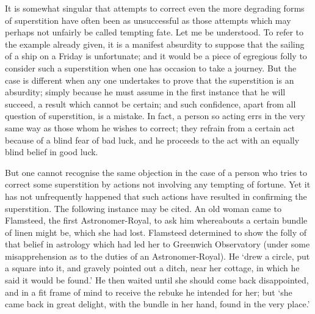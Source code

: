 \documentclass[letterpaper,12pt,oneside,openany]{memoir}
\begin{document}
It is somewhat singular that attempts to correct
even the more degrading forms of superstition have
often been as unsuccessful as those attempts which may
perhaps not unfairly be called tempting fate. Let me
be understood. To refer to the example already given,
it is a manifest absurdity to suppose that the sailing of
a ship on a Friday is unfortunate; and it would be a
piece of egregious folly to consider such a superstition
when one has occasion to take a journey. But the case
is different when any one undertakes to prove that the
superstition is an absurdity; simply because he must
assume in the first instance that he will succeed, a
result which cannot be certain; and such confidence,
apart from all question of superstition, is a mistake.
In fact, a person so acting errs in the very same way as
those whom he wishes to correct; they refrain from a
certain act because of a blind fear of bad luck, and he
proceeds to the act with an equally blind belief in good
luck.

But one cannot recognise the same objection in the
case of a person who tries to correct some superstition
by actions not involving any tempting of fortune.
Yet it has not unfrequently happened that such actions
have resulted in confirming the superstition. The
following instance may be cited. An old woman came
to Flamsteed, the first Astronomer-Royal, to ask him
whereabouts a certain bundle of linen might be, which
she had lost. Flamsteed determined to show the folly of
that belief in astrology which had led her to Greenwich
Observatory (under some misapprehension as to the
duties of an Astronomer-Royal). He `drew a circle,
put a square into it, and gravely pointed out a ditch,
near her cottage, in which he said it would be found.'
He then waited until she should come back disappointed,
and in a fit frame of mind to receive the
rebuke he intended for her; but `she came back in
great delight, with the bundle in her hand, found in
the very place.'
\end{document}
